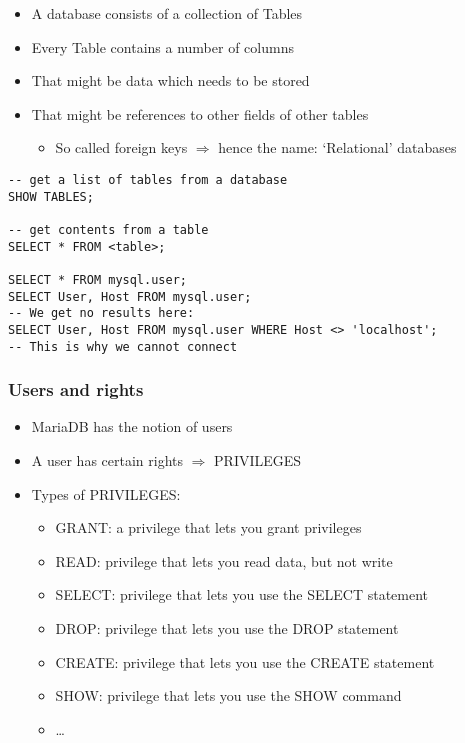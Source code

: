 \documentclass{article}
\begin{document}
\begin{itemize}
    \item A database consists of a collection of Tables
    \item Every Table contains a number of columns
    \item That might be data which needs to be stored
    \item That might be references to other fields of other tables
    \begin{itemize}
        \item So called foreign keys $\Rightarrow$ hence the name: `Relational' databases
    \end{itemize}
\end{itemize}

\begin{verbatim}
-- get a list of tables from a database
SHOW TABLES;

-- get contents from a table
SELECT * FROM <table>;

SELECT * FROM mysql.user;
SELECT User, Host FROM mysql.user;
-- We get no results here:
SELECT User, Host FROM mysql.user WHERE Host <> 'localhost';
-- This is why we cannot connect
\end{verbatim}

\subsubsection{Users and rights}

\begin{itemize}
    \item MariaDB has the notion of users
    \item A user has certain rights $\Rightarrow$ PRIVILEGES
    \item Types of PRIVILEGES:
    \begin{itemize}
        \item GRANT: a privilege that lets you grant privileges
        \item READ: privilege that lets you read data, but not write
        \item SELECT: privilege that lets you use the SELECT statement
        \item DROP: privilege that lets you use the DROP statement
        \item CREATE: privilege that lets you use the CREATE statement
        \item SHOW: privilege that lets you use the SHOW command
        \item \dots
    \end{itemize}
\end{itemize}
\end{document}
